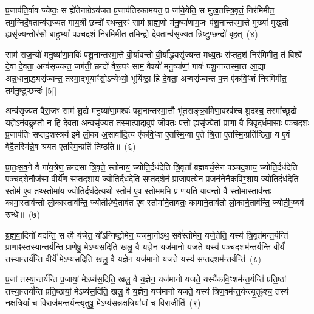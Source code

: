 प्र॒जा\-प॑ति॒र्वाव ज्येष्ठः॒ स ह्ये॑तेनाग्रे\-ऽय॑जत प्र॒जा\-प॑तिरकामयत॒ प्र जा॑ये॒येति॒ स मु॑ख॒तस्त्रि॒वृतं॒ निर॑मिमीत॒ तम॒ग्नि\-र्दे॒वतान्व॑सृज्यत गाय॒त्री छन्दो॑ रथन्त॒रꣳ साम॑ ब्राह्म॒णो म॑नु॒ष्या॑णाम॒जः प॑शू॒नान्तस्मा॒त्ते मुख्या॑ मुख॒तो ह्यसृ॑ज्य॒न्तोर॑सो बा॒हु\-भ्यां᳚ पञ्चद॒शं निर॑मिमीत॒ तमिन्द्रो॑ दे॒वतान्व॑सृज्यत त्रि॒ष्टुप्छन्दो॑ बृ॒हत्~(४)

साम॑ राज॒न्यो॑ मनु॒ष्या॑णा॒मविः॑ पशू॒नान्तस्मा॒त्ते वी॒र्या॑वन्तो वी॒र्या᳚द्ध्यसृ॑ज्यन्त मध्य॒तः स॑प्तद॒शं निर॑मिमीत॒ तं विश्वे॑ दे॒वा दे॒वता॒ अन्व॑सृज्यन्त॒ जग॑ती॒ छन्दो॑ वैरू॒पꣳ साम॒ वैश्यो॑ मनु॒ष्या॑णां॒ गावः॑ पशू॒नान्तस्मा॒त्त आ॒द्या॑ अन्न॒धाना॒\-द्ध्यसृ॑ज्यन्त॒ तस्मा॒द्भूयाꣳ॑सो॒\-ऽन्येभ्यो॒ भूयि॑ष्ठा॒ हि दे॒वता॒ अन्वसृ॑ज्यन्त प॒त्त ए॑कवि॒ꣳ॒शं निर॑मिमीत॒ तम॑नु॒ष्टुप्छन्दः॑ [5[]

अन्व॑सृज्यत वैरा॒जꣳ साम॑ शू॒द्रो म॑नु॒ष्या॑णा॒मश्वः॑ पशू॒नान्तस्मा॒त्तौ भू॑तसङ्क्रा॒मिणा॒वश्व॑श्च शू॒द्रश्च॒ तस्मा᳚च्छू॒द्रो य॒ज्ञे\-ऽन॑वकॢप्तो॒ न हि दे॒वता॒ अन्वसृ॑ज्यत॒ तस्मा॒त्पादा॒वुप॑ जीवतः प॒त्तो ह्यसृ॑ज्येतां प्रा॒णा वै त्रि॒वृद॑र्धमा॒साः प॑ञ्चद॒शः प्र॒जा\-प॑तिः सप्तद॒शस्त्रय॑ इ॒मे लो॒का अ॒सावा॑दि॒त्य ए॑कवि॒ꣳ॒श ए॒तस्मि॒न्वा ए॒ते श्रि॒ता ए॒तस्मि॒न्प्रति॑ष्ठिता॒ य ए॒वं वेदै॒तस्मि॑न्ने॒व श्र॑यत ए॒तस्मि॒न्प्रति॑ तिष्ठति॥~(६)

{\anuvakamend[{अस्थू॑रि॒रोष॑धीषु ज्येष्ठय॒ज्ञ इति॑ बृ॒हद॑नु॒ष्टुप्छन्दः॒ प्रति॑ष्ठिता॒ नव॑ च}]}%

प्रा॒तः॒स॒व॒ने वै गा॑य॒त्रेण॒ छन्द॑सा त्रि॒वृते॒ स्तोमा॑य॒ ज्योति॒र्दध॑देति त्रि॒वृता᳚ ब्रह्मवर्च॒सेन॑ पञ्चद॒शाय॒ ज्योति॒र्दध॑देति पञ्चद॒शेनौज॑सा वी॒र्ये॑ण सप्तद॒शाय॒ ज्योति॒र्दध॑देति सप्तद॒शेन॑ प्राजाप॒त्येन॑ प्र॒जन॑नेनैकवि॒ꣳ॒शाय॒ ज्योति॒र्दध॑देति॒ स्तोम॑ ए॒व तथ्स्तोमा॑य॒ ज्योति॒र्दध॑दे॒त्यथो॒ स्तोम॑ ए॒व स्तोम॑म॒भि प्र ण॑यति॒ याव॑न्तो॒ वै स्तोमा॒स्ताव॑न्तः॒ कामा॒स्ताव॑न्तो लो॒कास्ताव॑न्ति॒ ज्योतीꣴ॑ष्ये॒ताव॑त ए॒व स्तोमा॑ने॒ताव॑तः॒ कामा॑ने॒ताव॑तो लो॒काने॒ताव॑न्ति॒ ज्योती॒ꣳ॒ष्यव॑ रुन्धे॥~(७)

{\anuvakamend[{ताव॑न्तो लो॒कास्त्रयो॑दश च}]}%

ब्र॒ह्म॒वा॒दिनो॑ वदन्ति॒ स त्वै य॑जेत॒ यो᳚\-ऽग्निष्टो॒मेन॒ यज॑मा॒नो\-ऽथ॒ सर्व॑स्तोमेन॒ यजे॒तेति॒ यस्य॑ त्रि॒वृत॑मन्त॒र्यन्ति॑ प्रा॒णाꣴस्तस्या॒न्तर्य॑न्ति प्रा॒णेषु॒ मे\-ऽप्य॑स॒दिति॒ खलु॒ वै य॒ज्ञेन॒ यज॑मानो यजते॒ यस्य॑ पञ्चद॒शम॑न्त॒र्यन्ति॑ वी॒र्यं॑ तस्या॒न्तर्य॑न्ति वी॒र्ये॑ मे\-ऽप्य॑स॒दिति॒ खलु॒ वै य॒ज्ञेन॒ यज॑मानो यजते॒ यस्य॑ सप्तद॒शम॑न्त॒र्यन्ति॑~(८)

प्र॒जां तस्या॒न्तर्य॑न्ति प्र॒जायां॒ मे\-ऽप्य॑स॒दिति॒ खलु॒ वै य॒ज्ञेन॒ यज॑मानो यजते॒ यस्यै॑कवि॒ꣳ॒शम॑न्त॒र्यन्ति॑ प्रति॒ष्ठां तस्या॒न्तर्य॑न्ति प्रति॒ष्ठायां॒ मे\-ऽप्य॑स॒दिति॒ खलु॒ वै य॒ज्ञेन॒ यज॑मानो यजते॒ यस्य॑ त्रिण॒वम॑न्त॒र्यन्त्यृ॒तूꣴश्च॒ तस्य॑ नक्ष॒त्रियां᳚ च वि॒राज॑म॒न्तर्य॑न्त्यृ॒तुषु॒ मे\-ऽप्य॑सन्नक्ष॒त्रिया॑यां च वि॒राजीति॑~(९)


